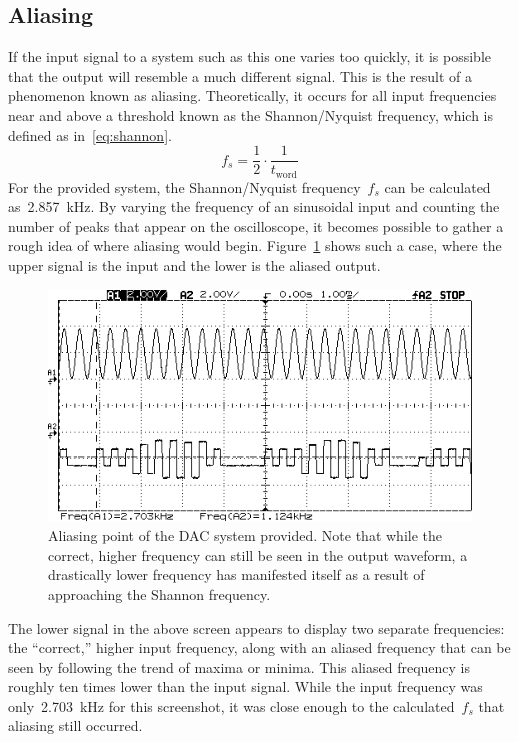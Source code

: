 \subsection{Aliasing}
If the input signal to a system such as this one varies too quickly, it is possible that the output will resemble a much different signal.  This is the result of a phenomenon known as aliasing.  Theoretically, it occurs for all input frequencies near and above a threshold known as the Shannon/Nyquist frequency, which is defined as in~\eqref{eq:shannon}.
%
\begin{equation}
	f_s = \frac{1}{2} \cdot \frac{1}{t_\text{word}} \label{eq:shannon}
\end{equation}
%
For the provided system, the Shannon/Nyquist frequency~$f_s$ can be calculated as~\SI{2.857}{\kilo\hertz}.  By varying the frequency of an sinusoidal input and counting the number of peaks that appear on the oscilloscope, it becomes possible to gather a rough idea of where aliasing would begin.  Figure~\ref{fig:pt7} shows such a case, where the upper signal is the input and the lower is the aliased output.
%
\begin{figure}[H]
	\centering
	\includegraphics[width=.6\textwidth]{img/shot/pt7_aliased.png}
	\parbox{.6\textwidth}{
	\caption[Aliasing]{Aliasing point of the DAC system provided.  Note that while the correct, higher frequency can still be seen in the output waveform, a drastically lower frequency has manifested itself as a result of approaching the Shannon frequency.}
	\label{fig:pt7}}
\end{figure}
%
The lower signal in the above screen appears to display two separate frequencies: the ``correct,'' higher input frequency, along with an aliased frequency that can be seen by following the trend of maxima or minima.  This aliased frequency is roughly ten times lower than the input signal.  While the input frequency was only~\SI{2.703}{\kilo\hertz} for this screenshot, it was close enough to the calculated~$f_s$ that aliasing still occurred.

